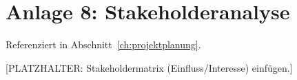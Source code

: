 \section*{Anlage 8: Stakeholderanalyse}
\label{anh:stakeholderanalyse}
Referenziert in Abschnitt~\ref{ch:projektplanung}.

[PLATZHALTER: Stakeholdermatrix (Einfluss/Interesse) einf\"ugen.]
